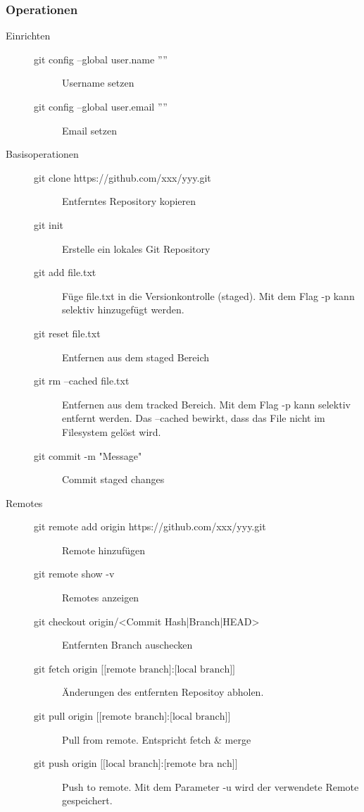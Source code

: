 \subsubsection{Operationen}
\begin{description}
	\item[Einrichten]  \hfill
	\begin{description}
		\item[git config --global user.name ''''] Username setzen
		\item[git config --global user.email ''''] Email setzen
	\end{description}
	\item[Basisoperationen] \hfill
	\begin{description}
		\item[git clone https://github.com/xxx/yyy.git] Entferntes Repository kopieren
		\item[git init] Erstelle ein lokales Git Repository
		\item[git add file.txt] Füge file.txt in die Versionkontrolle (staged). Mit dem Flag -p kann selektiv hinzugefügt werden.
		\item[git reset file.txt] Entfernen aus dem staged Bereich
		\item[git rm --cached file.txt] Entfernen aus dem tracked Bereich. Mit dem Flag -p kann selektiv entfernt werden. Das --cached bewirkt, dass das File nicht im Filesystem gelöst wird.
		\item[git commit -m "Message"] Commit staged changes
	\end{description}
	\item[Remotes] \hfill
	\begin{description}
		\item[git remote add origin https://github.com/xxx/yyy.git] Remote hinzufügen
		\item[git remote show -v] Remotes anzeigen
		\item[git checkout origin/<Commit Hash|Branch|HEAD>] Entfernten Branch auschecken
		\item[$\text{git fetch origin [[remote branch]:[local branch]]}$] Änderungen des entfernten Repositoy abholen.
		\item[$\text{git pull origin [[remote branch]:[local branch]]}$] Pull from remote. Entspricht fetch \& merge
		\item[$\text{git push origin [[local branch]:[remote bra nch]]}$] Push to remote. Mit dem Parameter -u wird der verwendete Remote gespeichert. 
	\end{description}

\end{description}
